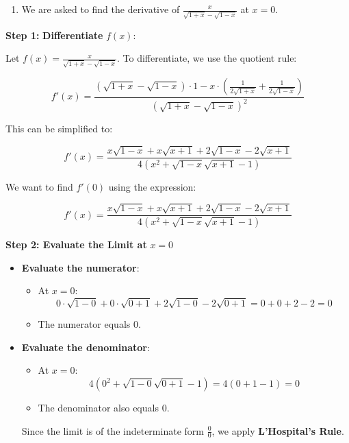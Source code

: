 \documentclass[
]{book}
\providecommand{\tightlist}{%
  \setlength{\itemsep}{0pt}\setlength{\parskip}{0pt}}
\begin{document}
\begin{enumerate}
\def\labelenumi{\arabic{enumi}.}
\setcounter{enumi}{5}
\tightlist
\item
  We are asked to find the derivative of
  \(\frac{x}{\sqrt{1+x} - \sqrt{1-x}}\) at \(x = 0\).
\end{enumerate}

\textbf{Step 1:} \textbf{Differentiate} \(f(x)\):

Let \(f(x) = \frac{x}{\sqrt{1+x} - \sqrt{1-x}}\). To differentiate, we
use the quotient rule:

\[
f'(x) = \frac{(\sqrt{1+x} - \sqrt{1-x}) \cdot 1 - x \cdot \left( \frac{1}{2\sqrt{1+x}} + \frac{1}{2\sqrt{1-x}} \right)}{(\sqrt{1+x} - \sqrt{1-x})^2}
\]

This can be simplified to:

\[
f'(x) = \frac{x \sqrt{1 - x} + x \sqrt{x + 1} + 2 \sqrt{1 - x} - 2 \sqrt{x + 1}}{4 \left( x^2 + \sqrt{1 - x} \sqrt{x + 1} - 1 \right)}
\]

We want to find \(f'(0)\) using the expression:

\[
f'(x) = \frac{x \sqrt{1 - x} + x \sqrt{x + 1} + 2 \sqrt{1 - x} - 2 \sqrt{x + 1}}{4 \left( x^2 + \sqrt{1 - x} \sqrt{x + 1} - 1 \right)}
\]

\textbf{Step 2: Evaluate the Limit at} \(x = 0\)

\begin{itemize}
\item
  \textbf{Evaluate the numerator}:

  \begin{itemize}
  \tightlist
  \item
    At \(x = 0\): \[
    0 \cdot \sqrt{1 - 0} + 0 \cdot \sqrt{0 + 1} + 2 \sqrt{1 - 0} - 2 \sqrt{0 + 1} = 0 + 0 + 2 - 2 = 0
    \]
  \item
    The numerator equals \(0\).
  \end{itemize}
\item
  \textbf{Evaluate the denominator}:

  \begin{itemize}
  \tightlist
  \item
    At \(x = 0\): \[
    4 \left( 0^2 + \sqrt{1 - 0} \sqrt{0 + 1} - 1 \right) = 4(0 + 1 - 1) = 0
    \]
  \item
    The denominator also equals \(0\).
  \end{itemize}

  Since the limit is of the indeterminate form \(\frac{0}{0}\), we apply
  \textbf{L'Hospital's Rule}.
\end{itemize}
\end{document}
